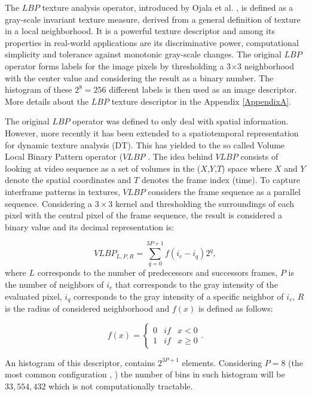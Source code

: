 The $LBP$ texture analysis operator, introduced by Ojala et al. \cite{ojala1996comparative,ojala2002multiresolution}, is defined as a gray-scale invariant  texture measure, derived from a general definition of texture in a local neighborhood. It is a powerful texture descriptor and among its properties in real-world applications are its discriminative power, computational simplicity and tolerance against monotonic gray-scale changes. The original $LBP$ operator forms labels for the image pixels by thresholding a 3$\times$3 neighborhood with the center value and considering the result as a binary number. The histogram of these $2^8=256$ different labels is then used as an image descriptor. More details about the $LBP$ texture descriptor in the Appendix \ref{AppendixA}.

The original $LBP$ operator was defined to only deal with spatial information. However, more recently it has been extended to a spatiotemporal representation for dynamic texture analysis (DT). This has yielded to the so called Volume Local Binary Pattern operator ($VLBP$ \cite{zhao2007dynamic}. The idea behind $VLBP$ consists of looking at video sequence as a set of volumes in the ($X$,$Y$,$T$) space where $X$ and $Y$ denote the spatial coordinates and $T$ denotes the frame index (time). To capture interframe patterns in textures, $VLBP$ considers the frame sequence as a parallel sequence. Considering a $3 \times 3$ kernel and thresholding the surroundings of each pixel with the central pixel of the frame sequence, the result is considered a binary value and its decimal representation is:

\begin{equation}
\label{eq:VLBP}
VLBP_{L,P,R} =  \sum_{q=0}^{3P+1}f(i_c - i_q)2^q,
\end{equation}
where $L$ corresponds to the number of predecessors and successors frames, $P$ is the number of neighbors of $i_c$ that corresponds to the gray intensity of the evaluated pixel, $i_q$ corresponds to the gray intensity of a specific neighbor of $i_c$, $R$ is the radius of considered neighborhood and $f(x)$ is defined as follows:

\begin{equation}
f(x)  =
\left\lbrace 
	\begin{array}{ccc}
		0 & if & x<0 \\
		1 & if & x\geq0 
	\end{array}. \right.
\label{eq:fx}
\end{equation}

An histogram of this descriptor, contains $2^{3P+1}$ elements. Considering $P=8$ (the most common configuration \cite{ChingovskaBIOSIG2012}, \cite{maatta2011face} \cite{ahonen2006face}) the number of bins in such histogram will be $33,554,432$ which is not computationally tractable.

